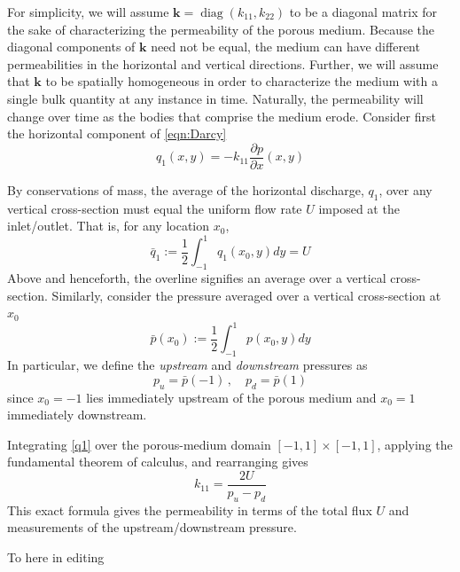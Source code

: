 \documentclass[3p]{elsarticle}
\newcommand{\vsp}[1]{\vspace{#1 pc} \noindent}
\newcommand{\nick}[1]{ {\color{red} #1} }
\newcommand{\pderiv}[2]{\frac{\partial #1}{\partial #2}}
\newcommand{\bvec}[1]{\mathbf{#1}}
\newcommand {\bq} {\bvec{q}}
\newcommand{\qavg}{\bar{q}}
\newcommand{\pavg}{\bar{p}}
\newcommand{\pup}{p_u}
\newcommand{\pdn}{p_d}
\newcommand{\diag}{\mathop{\mathrm{diag}}}
\begin{document}
For simplicity, we will assume $\bvec{k}  = \diag(k_{11}, k_{22})$ to be a diagonal matrix for the sake of characterizing the permeability of the porous medium. Because the diagonal components of $\bvec{k}$ need not be equal, the medium can have different permeabilities in the horizontal and vertical directions. Further, we will assume that $\bvec{k}$ to be spatially homogeneous in order to characterize the medium with a single bulk quantity at any instance in time. Naturally, the permeability will change over time as the bodies that comprise the medium erode. Consider first the horizontal component of \eqref{eqn:Darcy}
\begin{equation}
\label{q1}
q_1(x,y) = -k_{11} \pderiv{p}{x}(x,y)
\end{equation}

By conservations of mass, the average of the horizontal discharge, $q_1$, over any vertical cross-section must equal the uniform flow rate $U$ imposed at the inlet/outlet. That is, for any location $x_0$,
\begin{equation}
\qavg_1 := \frac{1}{2} \int_{-1}^{1} q_1(x_0, y) dy = U
\end{equation}
Above and henceforth, the overline signifies an average over a vertical cross-section. Similarly, consider the pressure averaged over a vertical cross-section at $x_0$
\begin{equation}
\pavg(x_0) := \frac{1}{2} \int_{-1}^{1} p(x_0, y) dy
\end{equation}
In particular, we define the {\em upstream} and {\em downstream} pressures as
\begin{equation}
\pup = \pavg(-1) \, , \quad \pdn = \pavg(1)
\end{equation}
since $x_0 = -1$ lies immediately upstream of the porous medium and $x_0 = 1$ immediately downstream.

Integrating \eqref{q1} over the porous-medium domain $[-1, 1] \times [-1,1]$, applying the fundamental theorem of calculus, and rearranging gives
\begin{equation}
k_{11} = \frac{2U}{\pup - \pdn}
\end{equation}
This exact formula gives the permeability in terms of the total flux $U$ and measurements of the upstream/downstream pressure.


\vsp{2} \nick{To here in editing} \vsp{2}


 
\end{document}
